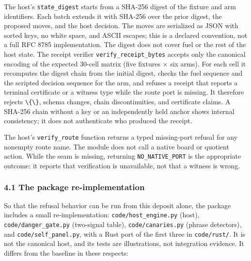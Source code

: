\documentclass[
  11pt,
]{article}
\newcommand{\passthrough}[1]{#1}
\begin{document}
The host's \texttt{\nolinkurl{state_digest}} starts from a SHA-256
digest of the fixture and arm identifiers. Each batch extends it with
SHA-256 over the prior digest, the proposed moves, and the host
decision. The moves are serialized as JSON with sorted keys, no white
space, and ASCII escapes; this is a declared convention, not a full RFC
8785 implementation. The digest does not cover fuel or the rest of the
host state. The receipt verifier
\texttt{\nolinkurl{verify_receipt_bytes}} accepts only the
canonical encoding of the expected 30-cell matrix (five fixtures × six
arms). For each cell it recomputes the digest chain from the initial
digest, checks the fuel sequence and the scripted decision sequence for
the arm, and refuses a receipt that reports a terminal certificate or a
witness type while the route port is missing. It therefore rejects
\passthrough{\lstinline!\{\}!}, schema changes, chain discontinuities,
and certificate claims. A SHA-256 chain without a key or an
independently held anchor shows internal consistency; it does not
authenticate who produced the receipt.

The host's \texttt{\nolinkurl{verify_route}} function returns a
typed missing-port refusal for any nonempty route name. The module does
not call a native board or quotient action. While the seam is missing,
returning \texttt{\nolinkurl{NO_NATIVE_PORT}} is the appropriate
outcome: it reports that verification is unavailable, not that a witness
is wrong.

\hypertarget{the-package-re-implementation}{%
\subsubsection{4.1 The package
re-implementation}\label{the-package-re-implementation}}

So that the refusal behavior can be run from this deposit alone, the
package includes a small re-implementation:
\texttt{\nolinkurl{code/host_engine.py}} (host),
\texttt{\nolinkurl{code/danger_gate.py}} (two-signal table),
\texttt{\nolinkurl{code/canaries.py}} (phrase detectors), and
\texttt{\nolinkurl{code/self_panel.py}}, with a Rust port of the
first three in \texttt{\nolinkurl{code/rust/}}. It is not the
canonical host, and its tests are illustrations, not integration
evidence. It differs from the baseline in these respects:
\end{document}
